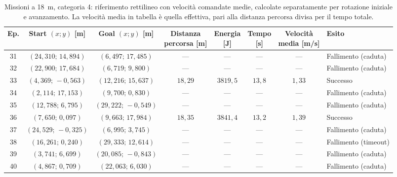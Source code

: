 \begin{table}[H]
\centering
\caption{Missioni a 18~m, categoria 4: riferimento rettilineo con velocità comandate medie, calcolate separatamente per rotazione iniziale e avanzamento. La velocità media in tabella è quella effettiva, pari alla distanza percorsa divisa per il tempo totale.}
\label{tab:straight-line-command-mean-18m-cat4}
\begingroup
\fontsize{9}{11}\selectfont
\setlength{\tabcolsep}{2.5pt}
\renewcommand{\arraystretch}{1.2}
\begin{tabular}{@{}c cc cccc l@{}}
\toprule
Ep. & \shortstack{Start $(x;y)$\\{}[m]} & \shortstack{Goal $(x;y)$\\{}[m]} & \shortstack{Distanza\\percorsa [m]} & \shortstack{Energia\\{}[J]} & \shortstack{Tempo\\{}[s]} & \shortstack{Velocità\\media [m/s]} & Esito \\
\midrule
31 & $(24{,}310;\,14{,}894)$ & $(6{,}497;\,17{,}485)$ & --- & --- & --- & --- & Fallimento (caduta) \\
32 & $(22{,}900;\,17{,}684)$ & $(6{,}719;\,9{,}800)$ & --- & --- & --- & --- & Fallimento (caduta) \\
33 & $(4{,}369;\,-0{,}563)$ & $(12{,}216;\,15{,}637)$ & $18{,}29$ & $3819{,}5$ & $13{,}8$ & $1{,}33$ & Successo \\
34 & $(2{,}114;\,17{,}153)$ & $(9{,}700;\,0{,}830)$ & --- & --- & --- & --- & Fallimento (caduta) \\
35 & $(12{,}788;\,6{,}795)$ & $(29{,}222;\,-0{,}549)$ & --- & --- & --- & --- & Fallimento (caduta) \\
36 & $(7{,}650;\,0{,}097)$ & $(9{,}663;\,17{,}984)$ & $18{,}35$ & $3841{,}4$ & $13{,}2$ & $1{,}39$ & Successo \\
37 & $(24{,}529;\,-0{,}325)$ & $(6{,}995;\,3{,}745)$ & --- & --- & --- & --- & Fallimento (caduta) \\
38 & $(16{,}261;\,0{,}240)$ & $(29{,}333;\,12{,}614)$ & --- & --- & --- & --- & Fallimento (timeout) \\
39 & $(3{,}741;\,6{,}699)$ & $(20{,}085;\,-0{,}843)$ & --- & --- & --- & --- & Fallimento (caduta) \\
40 & $(4{,}867;\,0{,}709)$ & $(22{,}063;\,6{,}030)$ & --- & --- & --- & --- & Fallimento (caduta) \\
\bottomrule
\end{tabular}
\endgroup
\end{table}
